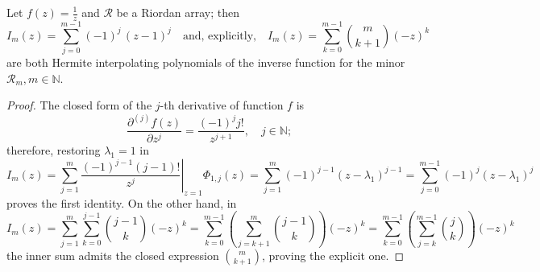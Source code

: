 

\begin{theorem}
\label{thm:inverse-Hermite-interpolating-poly-implicit}
Let $f(z)=\frac{1}{z}$ and $\mathcal{R}$ be a Riordan array; then 
\begin{equation}
  \label{eq:inverse-Hermite-interpolating-poly}
  I_{m}(z) = \sum_{j=0}^{m-1}{(-1)^{j}\,\left(z-1\right)^{j}}
  \quad\text{and, explicitly,}\quad
  I_{m}(z) = \sum_{k=0}^{m-1}{{ {m}\choose{k+1}}(-z)^{k}}
\end{equation}
are both Hermite interpolating polynomials of the inverse function for the minor
$\mathcal{R}_{m}, m\in\mathbb{N}$.
\end{theorem}

\begin{proof}
The closed form of the $j$-th derivative of function $f$ is 
\begin{displaymath}
\frac{\partial^{(j)}{f}(z)}{\partial{z}^{j}} = \frac{(-1)^{j}j!}{z^{j+1}},\quad j\in\mathbb{N};
\end{displaymath}
therefore, restoring $\lambda_{1}=1$ in
\begin{displaymath}
  I_{m}(z) = \sum_{j=1}^{m}{ \left. \frac{(-1)^{j-1}(j-1)!}{z^{j}} \right|_{z=1}\Phi_{1,j}(z)}
       = \sum_{j=1}^{m}{(-1)^{j-1}\left(z-\lambda_{1}\right)^{j-1}}
       = \sum_{j=0}^{m-1}{(-1)^{j}\left(z-\lambda_{1}\right)^{j}}
\end{displaymath}
proves the first identity.  On the other hand, in
\begin{displaymath}
  I_{m}(z) = \sum_{j=1}^{m}{\sum_{k=0}^{j-1}{{{j-1}\choose{k}}(-z)^{k}}}
       = \sum_{k=0}^{m-1}{\left(\sum_{j=k+1}^{m}{{{j-1}\choose{k}}}\right)(-z)^{k}}
       = \sum_{k=0}^{m-1}{\left(\sum_{j=k}^{m-1}{{{j}\choose{k}}}\right)(-z)^{k}}
\end{displaymath}
the inner sum admits the closed expression ${{m}\choose{k+1}}$, proving the explicit one.
\qedhere
\end{proof}





